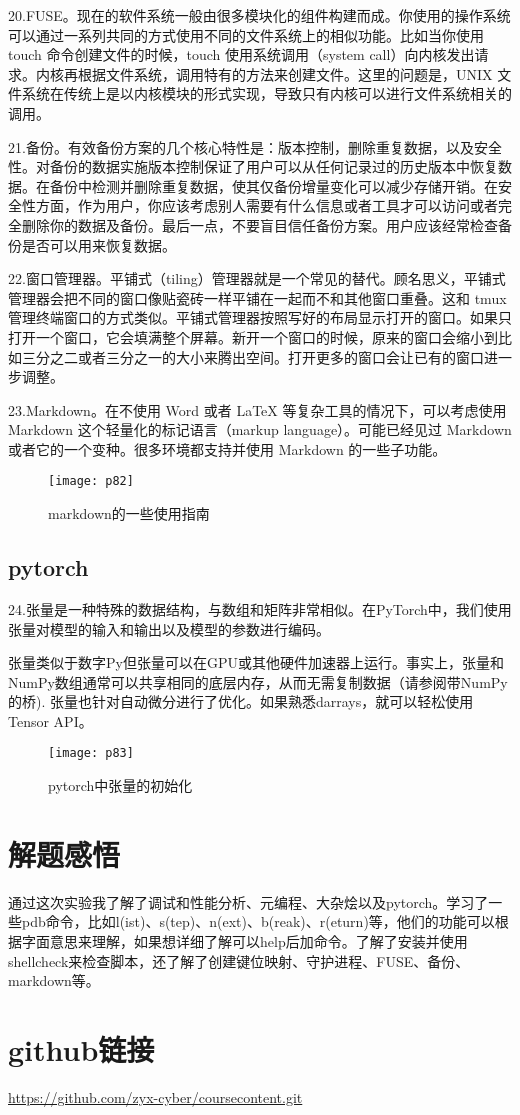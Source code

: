 \documentclass[a4paper ,12pt]{article}
\begin{document}
	20.FUSE。现在的软件系统一般由很多模块化的组件构建而成。你使用的操作系统可以通过一系列共同的方式使用不同的文件系统上的相似功能。比如当你使用 touch 命令创建文件的时候，touch 使用系统调用（system call）向内核发出请求。内核再根据文件系统，调用特有的方法来创建文件。这里的问题是，UNIX 文件系统在传统上是以内核模块的形式实现，导致只有内核可以进行文件系统相关的调用。
	
	21.备份。有效备份方案的几个核心特性是：版本控制，删除重复数据，以及安全性。对备份的数据实施版本控制保证了用户可以从任何记录过的历史版本中恢复数据。在备份中检测并删除重复数据，使其仅备份增量变化可以减少存储开销。在安全性方面，作为用户，你应该考虑别人需要有什么信息或者工具才可以访问或者完全删除你的数据及备份。最后一点，不要盲目信任备份方案。用户应该经常检查备份是否可以用来恢复数据。
	
	22.窗口管理器。平铺式（tiling）管理器就是一个常见的替代。顾名思义，平铺式管理器会把不同的窗口像贴瓷砖一样平铺在一起而不和其他窗口重叠。这和 tmux 管理终端窗口的方式类似。平铺式管理器按照写好的布局显示打开的窗口。如果只打开一个窗口，它会填满整个屏幕。新开一个窗口的时候，原来的窗口会缩小到比如三分之二或者三分之一的大小来腾出空间。打开更多的窗口会让已有的窗口进一步调整。
	
	23.Markdown。在不使用 Word 或者 LaTeX 等复杂工具的情况下，可以考虑使用 Markdown 这个轻量化的标记语言（markup language）。可能已经见过 Markdown 或者它的一个变种。很多环境都支持并使用 Markdown 的一些子功能。
	\begin{figure}[h]
		\centering
		\texttt{[image: p82]}
		\caption{markdown的一些使用指南}
	\end{figure}
	
	\subsection{pytorch}
	24.张量是一种特殊的数据结构，与数组和矩阵非常相似。在PyTorch中，我们使用张量对模型的输入和输出以及模型的参数进行编码。
	
	张量类似于数字Py但张量可以在GPU或其他硬件加速器上运行。事实上，张量和NumPy数组通常可以共享相同的底层内存，从而无需复制数据（请参阅带NumPy的桥). 张量也针对自动微分进行了优化。如果熟悉darrays，就可以轻松使用Tensor API。
	\begin{figure}[h]
		\centering
		\texttt{[image: p83]}
		\caption{pytorch中张量的初始化}
	\end{figure}
	
	\section{解题感悟}
	通过这次实验我了解了调试和性能分析、元编程、大杂烩以及pytorch。学习了一些pdb命令，比如l(ist)、s(tep)、n(ext)、b(reak)、r(eturn)等，他们的功能可以根据字面意思来理解，如果想详细了解可以help后加命令。了解了安装并使用shellcheck来检查脚本，还了解了创建键位映射、守护进程、FUSE、备份、markdown等。
	
	
	
	\section{github链接}
	\href{https://github.com/zyx-cyber/coursecontent.git}{https://github.com/zyx-cyber/coursecontent.git}
	
	
\end{document}
